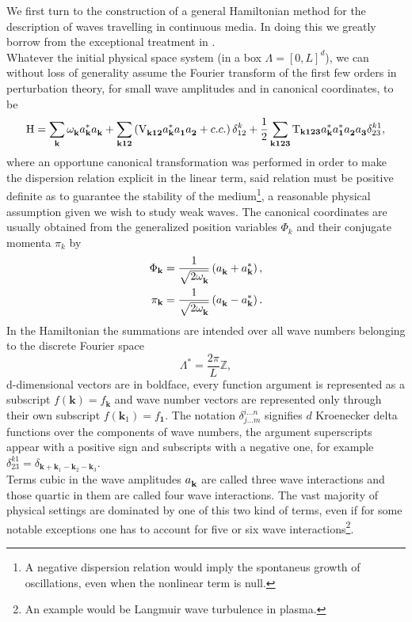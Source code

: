 We first turn to the construction of a general Hamiltonian method for the description of waves travelling in continuous media. In doing this
we greatly borrow from the exceptional treatment in \cite{Zakharov}. \\
Whatever the initial physical space system (in a box $\Lambda = [0,L]^d$), we can without loss of generality assume the Fourier transform of the first few orders in 
perturbation theory, for small wave amplitudes and in canonical coordinates, to be
\begin{equation}
    \mathrm{H} = \sum_\mathbf{k} \omega^{}_\mathbf{k} a_\mathbf{k}^{*} a_\mathbf{k}^{} + \sum_{\mathbf{k12}} \left( \mathrm{V}_{\mathbf{k12}}^{} a_\mathbf{k}^{*}a_\mathbf{1}^{}a_\mathbf{2}^{} + c.c.  \right)\delta^{k}_{12} \\
    +\frac{1}{2}\sum_{\mathbf{k123}} \mathrm{T}_{\mathbf{k123}} a_\mathbf{k}^{*}a_\mathbf{1}^{*}a_\mathbf{2}^{}a_\mathbf{3}^{}\delta^{k1}_{23},
    \label{HamOrig}
\end{equation}
where an opportune canonical transformation was performed in order to make the dispersion relation explicit in the linear term, said relation must be positive definite 
as to guarantee the stability of the medium\footnote{A negative dispersion relation would imply the spontaneus growth of oscillations, even when the nonlinear
term is null.}, a reasonable physical assumption given we wish to study weak waves. The canonical coordinates are usually obtained from the generalized position
variables $\Phi_k$ and their conjugate momenta $\pi_k$ by
\begin{align*}
    \Phi_\mathbf{k} &= \frac{1}{\sqrt{2\omega^{}_{\mathbf{k}}}}\left(a_\mathbf{k}^{} + a_\mathbf{k}^{*}\right) , \\
    \pi_\mathbf{k} &= \frac{1}{\sqrt{2\omega^{}_{\mathbf{k}}}}\left(a_\mathbf{k}^{} - a_\mathbf{k}^{*} \right) .
\end{align*}
In the Hamiltonian the summations are intended over all wave numbers belonging to the discrete Fourier space 
\begin{equation}
    \Lambda^* = \frac{2\pi}{L}\mathbb{Z},
\end{equation}
d-dimensional vectors are in boldface, every function argument is represented as a subscript $f(\mathbf{k})=f_\mathbf{k}$ and wave number vectors are 
represented only through their own subscript $f(\mathbf{k}_1)=f_\mathbf{1}$. The notation $\delta^{i\dots n}_{j \dots m}$ signifies $d$ Kroenecker delta functions over the components of 
wave numbers, 
the argument superscripts appear with a positive sign and subscripts with a negative one, for example $\delta^{k1}_{23} = \delta_{\mathbf{k} + \mathbf{k}_1 - 
\mathbf{k}_2 - \mathbf{k}_3}$.\\
Terms cubic in the wave amplitudes $a_\mathbf{k}^{}$ are called three wave interactions and those quartic in them are called four wave interactions. The vast majority of physical 
settings are dominated by one of this two kind of terms, even if for some notable exceptions one has to account for five or six wave interactions\footnote{An example would be
Langmuir wave turbulence in plasma.}. \\

